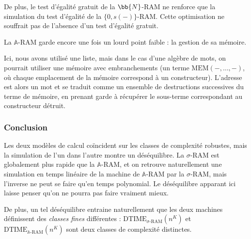 \documentclass{report}
\newcommand{\bbA}{\mathbb{A}}
\begin{document}
				De plus, le test d'égalité gratuit de la $\bb{N}$-RAM ne renforce que la simulation du test d'égalité de la $\{0,s(-)\}$-RAM. Cette optimisation ne souffrait pas de l'absence d'un test d'égalité gratuit. 
				
				La $\bbA$-RAM garde encore une fois un lourd point faible : la gestion de sa mémoire.
				
				Ici, nous avons utilisé une liste, mais dans le cas d'une algèbre de mots, on pourrait utiliser une mémoire avec embranchements (un terme $\text{MEM}\left( -, \dots, -\right)$, où chaque emplacement de la mémoire correspond à un constructeur). L'adresse est alors un mot et se traduit comme un ensemble de destructions successives du terme de mémoire, en prenant garde à récupérer le sous-terme correspondant au constructeur détruit.				

			\subsubsection{Conclusion}

				
				
				Les deux modèles de calcul coïncident sur les classes de complexité robustes, mais la simulation de l'un dans l'autre montre un déséquilibre. La $\sigma$-RAM est globalement plus rapide que la $\bbA$-RAM, et on retrouve naturellement une simulation en temps linéaire de la machine de $\bbA$-RAM par la $\sigma$-RAM, mais l'inverse ne peut se faire qu'en temps polynomial. Le déséquilibre apparant ici laisse penser qu'on ne pourra pas faire vraiment mieux.
				
				De plus, un tel déséquilibre entraine naturellement que les deux machines définissent des \emph{classes fines} différentes : $\text{DTIME}_{\sigma\text{-RAM}}\left(n^K\right)$ et $\text{DTIME}_{\bbA\text{-RAM}}\left(n^K\right)$ sont deux classes de complexité distinctes.






%		
%			
%			
			
			
	
			

	
			
	
	
			
\end{document}
